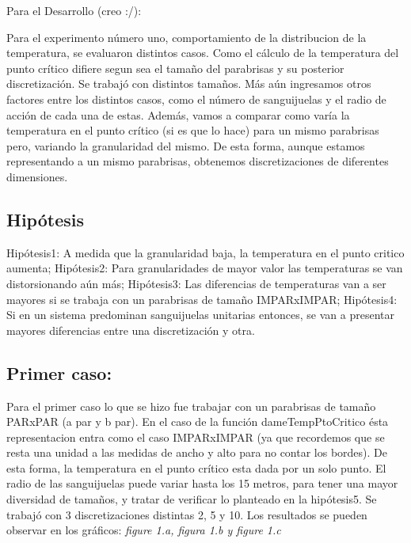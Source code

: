 \documentclass[a4paper]{article}
\begin{document}
Para el Desarrollo (creo :/):\newline

Para el experimento número uno, comportamiento de la distribucion de la temperatura, se evaluaron distintos casos. Como el cálculo de la temperatura del punto crítico difiere segun sea el tamaño del parabrisas y su posterior discretización. Se trabajó con distintos tamaños. Más aún ingresamos otros factores entre los distintos casos, como el número de sanguijuelas y  el radio de acción de cada una de estas. Además, vamos a comparar como varía la temperatura en el punto crítico (si es que lo hace) para un mismo parabrisas pero, variando la granularidad del mismo. De esta forma, aunque estamos representando a un mismo parabrisas, obtenemos discretizaciones de diferentes dimensiones.        

\subsection{Hipótesis}

Hipótesis1: A medida que la granularidad baja, la temperatura en el punto critico aumenta;\newline
Hipótesis2: Para granularidades de mayor valor las temperaturas se van distorsionando aún más;\newline
Hipótesis3: Las diferencias de temperaturas van a ser mayores si se trabaja con un parabrisas de tamaño IMPARxIMPAR;\newline
Hipótesis4: Si en un sistema predominan sanguijuelas unitarias entonces, se van a presentar mayores diferencias entre una discretización y otra.\newline


\subsection{Primer caso:}

Para el primer caso lo que se hizo fue trabajar con un parabrisas de tamaño PARxPAR (a par y b par). En el caso de la función dameTempPtoCritico ésta representacion entra como el caso IMPARxIMPAR (ya que recordemos que se resta una unidad a las medidas de ancho y alto para no contar los bordes). De esta forma, la temperatura en el punto crítico esta dada por un solo punto.
El radio de las sanguijuelas puede variar hasta los 15 metros, para tener una mayor diversidad de tamaños, y tratar de verificar lo planteado en la hipótesis5.\newline
Se trabajó con 3 discretizaciones distintas 2, 5 y 10. Los resultados se pueden observar en los gráficos: \textit{figure 1.a, figura 1.b y figure 1.c}
\end{document}
